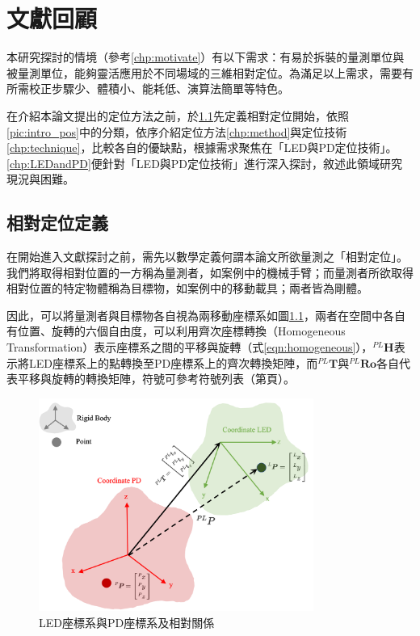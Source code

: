 \chapter{文獻回顧}







本研究探討的情境（參考\ref{chp:motivate}）有以下需求：有易於拆裝的量測單位與被量測單位，能夠靈活應用於不同場域的三維相對定位。為滿足以上需求，需要有所需校正步驟少、體積小、能耗低、演算法簡單等特色。

在介紹本論文提出的定位方法之前，於\ref{chp:relative}先定義相對定位開始，依照\ref{pic:intro_pos}中的分類，依序介紹定位方法\ref{chp:method}與定位技術\ref{chp:technique}，比較各自的優缺點，根據需求聚焦在「LED與PD定位技術」。\ref{chp:LEDandPD}便針對「LED與PD定位技術」進行深入探討，敘述此領域研究現況與困難。









\section{相對定位定義}
\label{chp:relative}
    
    在開始進入文獻探討之前，需先以數學定義何謂本論文所欲量測之「相對定位」。我們將取得相對位置的一方稱為量測者，如案例中的機械手臂；而量測者所欲取得相對位置的特定物體稱為目標物，如案例中的移動載具；兩者皆為剛體。
    
    因此，可以將量測者與目標物各自視為兩移動座標系如圖\ref{pic:homo_trans}，兩者在空間中各自有位置、旋轉的六個自由度，可以利用齊次座標轉換（Homogeneous Transformation）表示座標系之間的平移與旋轉（式\ref{eqn:homogeneous}），$^{PL}\boldsymbol{H}$表示將LED座標系上的點轉換至PD座標系上的齊次轉換矩陣，而$^{PL}\boldsymbol{T}$與$^{PL}\boldsymbol{Ro}$各自代表平移與旋轉的轉換矩陣，符號可參考符號列表（第\pageref{chp:symbol}頁）。
    
    \begin{figure}[ht]
        \centering
        \includegraphics[width=9cm]{ch2pic/homo_trans.png}
        \caption{LED座標系與PD座標系及相對關係}
        \label{pic:homo_trans}
    \end{figure}

